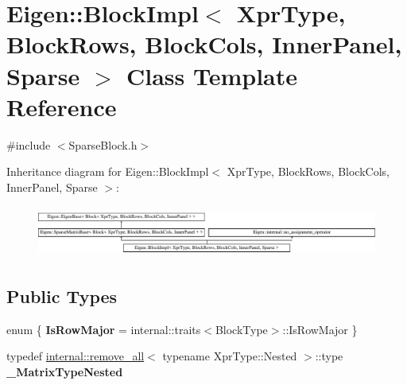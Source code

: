 \hypertarget{class_eigen_1_1_block_impl_3_01_xpr_type_00_01_block_rows_00_01_block_cols_00_01_inner_panel_00_01_sparse_01_4}{}\section{Eigen\+::Block\+Impl$<$ Xpr\+Type, Block\+Rows, Block\+Cols, Inner\+Panel, Sparse $>$ Class Template Reference}
\label{class_eigen_1_1_block_impl_3_01_xpr_type_00_01_block_rows_00_01_block_cols_00_01_inner_panel_00_01_sparse_01_4}


{\ttfamily \#include $<$Sparse\+Block.\+h$>$}

Inheritance diagram for Eigen\+::Block\+Impl$<$ Xpr\+Type, Block\+Rows, Block\+Cols, Inner\+Panel, Sparse $>$\+:\begin{figure}[H]
\begin{center}
\leavevmode
\includegraphics[height=1.700405cm]{class_eigen_1_1_block_impl_3_01_xpr_type_00_01_block_rows_00_01_block_cols_00_01_inner_panel_00_01_sparse_01_4}
\end{center}
\end{figure}
\subsection*{Public Types}
\begin{DoxyCompactItemize}
\item 
\mbox{\label{class_eigen_1_1_block_impl_3_01_xpr_type_00_01_block_rows_00_01_block_cols_00_01_inner_panel_00_01_sparse_01_4_aae2280818a7ae78f7d6de15cd6ced319}} 
enum \{ {\bfseries Is\+Row\+Major} = internal\+::traits$<$Block\+Type$>$\+::Is\+Row\+Major
 \}
\item 
\mbox{\label{class_eigen_1_1_block_impl_3_01_xpr_type_00_01_block_rows_00_01_block_cols_00_01_inner_panel_00_01_sparse_01_4_acc94ba0d1f7f531a08624d7725bb6aca}} 
typedef \mbox{\hyperlink{struct_eigen_1_1internal_1_1remove__all}{internal\+::remove\+\_\+all}}$<$ typename Xpr\+Type\+::\+Nested $>$\+::type {\bfseries \+\_\+\+Matrix\+Type\+Nested}
\end{DoxyCompactItemize}
